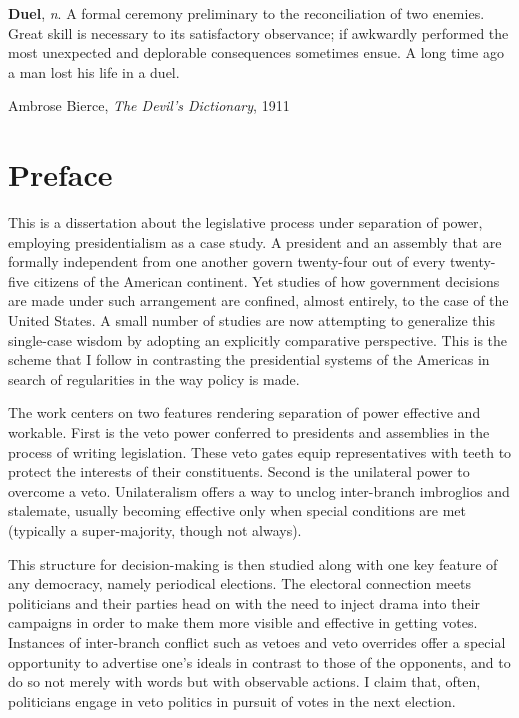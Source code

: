 \epigraph{\textbf{Duel}, \emph{n}.  A formal ceremony preliminary to the reconciliation of two enemies.  Great skill is necessary to its satisfactory observance; if awkwardly performed the most unexpected and deplorable consequences sometimes ensue.  A long time ago a man lost his life in a duel.}{Ambrose Bierce, \emph{The Devil's Dictionary}, 1911}

\chapter{Preface}
\label{ch:preface}

This is a dissertation about the legislative process under separation of power, employing presidentialism as a case study.  A president and an assembly that are formally independent from one another govern twenty-four out of every twenty-five citizens of the American continent.  Yet studies of how government decisions are made under such arrangement are confined, almost entirely, to the case of the United States.  A small number of studies are now attempting to generalize this single-case wisdom by adopting an explicitly comparative perspective.  This is the scheme that I follow in contrasting the presidential systems of the Americas in search of regularities in the way policy is made.  

The work centers on two features rendering separation of power effective and workable.  First is the veto power conferred to presidents and assemblies in the process of writing legislation.  These veto gates equip representatives with teeth to protect the interests of their constituents.  Second is the unilateral power to overcome a veto.  Unilateralism offers a way to unclog inter-branch imbroglios and stalemate, usually becoming effective only when special conditions are met (typically a super-majority, though not always).  

This structure for decision-making is then studied along with one key feature of any democracy, namely periodical elections.  The electoral connection meets politicians and their parties head on with the need to inject drama into their campaigns in order to make them more visible and effective in getting votes.  Instances of inter-branch conflict such as vetoes and veto overrides offer a special opportunity to advertise one's ideals in contrast to those of the opponents, and to do so not merely with words but with observable actions.  I claim that, often, politicians engage in veto politics in pursuit of votes in the next election.  

